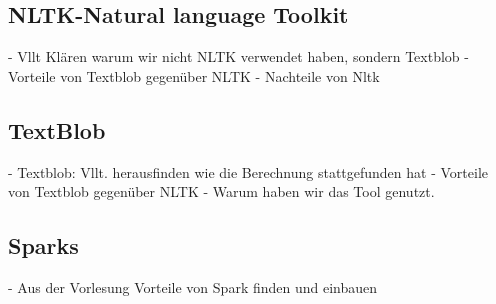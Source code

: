 	\subsection{NLTK-Natural language Toolkit}
	- Vllt Klären warum wir nicht NLTK verwendet haben, sondern Textblob
	- Vorteile von Textblob gegenüber NLTK
	- Nachteile von Nltk	
	

	\subsection{TextBlob}
	- Textblob: Vllt. herausfinden wie die Berechnung stattgefunden hat	
	- Vorteile von Textblob gegenüber NLTK
	- Warum haben wir das Tool genutzt.	
	

	\subsection{Sparks}
	- Aus der Vorlesung Vorteile von Spark finden und einbauen	
	


	
